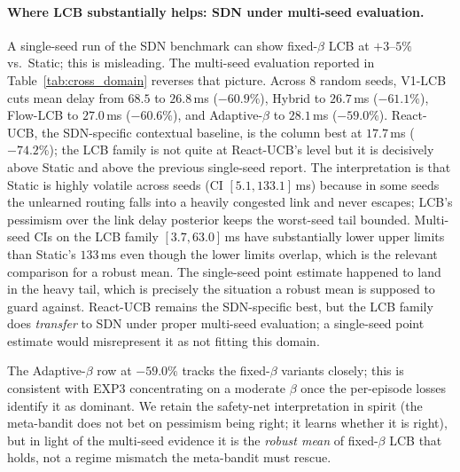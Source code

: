 \documentclass[11pt]{article}
\theoremstyle{definition}
\theoremstyle{remark}
\begin{document}
\paragraph{Where LCB substantially helps: SDN under multi-seed evaluation.}
A single-seed run of the SDN benchmark can show fixed-$\beta$ LCB
at $+3$--$5\%$ vs.\ Static; this is misleading. The multi-seed
evaluation reported in Table~\ref{tab:cross_domain} reverses
that picture. Across $8$
random seeds, V1-LCB cuts mean delay from $68.5$ to $26.8$\,ms
($-60.9\%$), Hybrid to $26.7$\,ms ($-61.1\%$), Flow-LCB to
$27.0$\,ms ($-60.6\%$), and Adaptive-$\beta$ to $28.1$\,ms
($-59.0\%$). React-UCB, the SDN-specific contextual baseline, is
the column best at $17.7$\,ms ($-74.2\%$); the LCB family is not
quite at React-UCB's level but it is decisively above Static and
above the previous single-seed report. The interpretation is that
Static is highly volatile across seeds (CI $[5.1, 133.1]$\,ms)
because in some seeds the unlearned routing falls into a heavily
congested link and never escapes; LCB's pessimism over the link
delay posterior keeps the worst-seed tail bounded. Multi-seed CIs
on the LCB family $[3.7, 63.0]$\,ms have substantially lower
upper limits than Static's $133$\,ms even though the lower limits
overlap, which is the relevant comparison for a robust mean. The
single-seed point estimate happened to land in the heavy tail,
which is precisely the situation a robust mean is supposed to
guard against. React-UCB remains the SDN-specific best, but the
LCB family does \emph{transfer} to SDN under proper multi-seed
evaluation; a single-seed point estimate would misrepresent it as
not fitting this domain.

The Adaptive-$\beta$ row at $-59.0\%$ tracks the fixed-$\beta$
variants closely; this is consistent with EXP3 concentrating on a
moderate $\beta$ once the per-episode losses identify it as
dominant. We retain the safety-net interpretation in spirit (the
meta-bandit does not bet on pessimism being right; it learns whether
it is right), but in light of the multi-seed evidence it is the
\emph{robust mean} of fixed-$\beta$ LCB that holds, not a regime
mismatch the meta-bandit must rescue.
\end{document}
